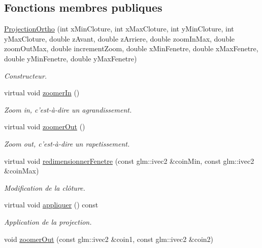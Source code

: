 \subsection*{Fonctions membres publiques}
\begin{DoxyCompactItemize}
\item 
\hyperlink{classvue_1_1_projection_ortho_a06b243688202d77b06d88eea8f97bc1d}{Projection\-Ortho} (int x\-Min\-Cloture, int x\-Max\-Cloture, int y\-Min\-Cloture, int y\-Max\-Cloture, double z\-Avant, double z\-Arriere, double zoom\-In\-Max, double zoom\-Out\-Max, double increment\-Zoom, double x\-Min\-Fenetre, double x\-Max\-Fenetre, double y\-Min\-Fenetre, double y\-Max\-Fenetre)
\begin{DoxyCompactList}\small\item\em Constructeur. \end{DoxyCompactList}\item 
virtual void \hyperlink{classvue_1_1_projection_ortho_a4c0a5d669d4fd937ce3ac1a3fe63dc7b}{zoomer\-In} ()
\begin{DoxyCompactList}\small\item\em Zoom in, c'est-\/à-\/dire un agrandissement. \end{DoxyCompactList}\item 
virtual void \hyperlink{classvue_1_1_projection_ortho_a5dd1f08ff6161ccce6b2dfa8dc5dfe40}{zoomer\-Out} ()
\begin{DoxyCompactList}\small\item\em Zoom out, c'est-\/à-\/dire un rapetissement. \end{DoxyCompactList}\item 
virtual void \hyperlink{classvue_1_1_projection_ortho_a6fd137b30eb514fcdb6ad02049a10eff}{redimensionner\-Fenetre} (const glm\-::ivec2 \&coin\-Min, const glm\-::ivec2 \&coin\-Max)
\begin{DoxyCompactList}\small\item\em Modification de la clôture. \end{DoxyCompactList}\item 
virtual void \hyperlink{classvue_1_1_projection_ortho_aa2b76e034f890dba75852db6fd0b254c}{appliquer} () const 
\begin{DoxyCompactList}\small\item\em Application de la projection. \end{DoxyCompactList}\item 
void \hyperlink{classvue_1_1_projection_ortho_ae9ef7dc22c268c40f55ef3433fca8d76}{zoomer\-Out} (const glm\-::ivec2 \&coin1, const glm\-::ivec2 \&coin2)

\end{DoxyCompactItemize}

